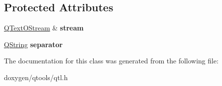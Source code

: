 \subsection*{Protected Attributes}
\begin{DoxyCompactItemize}
\item 
\mbox{\label{class_q_text_o_stream_iterator_af29ab04351a36cea2fa2d25ae232d18f}} 
\mbox{\hyperlink{class_q_text_o_stream}{Q\+Text\+O\+Stream}} \& {\bfseries stream}
\item 
\mbox{\label{class_q_text_o_stream_iterator_a47ce0aaa5f5932bdde944a7d37cc982c}} 
\mbox{\hyperlink{class_q_string}{Q\+String}} {\bfseries separator}
\end{DoxyCompactItemize}


The documentation for this class was generated from the following file\+:\begin{DoxyCompactItemize}
\item 
doxygen/qtools/qtl.\+h\end{DoxyCompactItemize}
